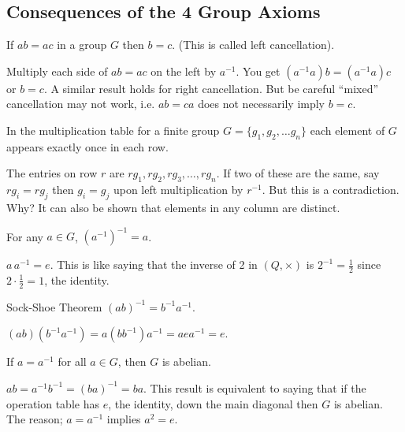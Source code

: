 \documentclass[12pt]{book}
\theoremstyle{definition}
\begin{document}
\subsection{Consequences of the 4 Group Axioms}
%
\begin{tctheorem}{}{}
If $ab=ac$ in a group $G$ then $b=c$.  (This is called left cancellation).
\end{tctheorem}
\begin{newproof}
Multiply each side of $ab=ac$ on the left by $a^{-1}$.  You get $(a^{-1}a)b=(a^{-1}a)c$ or $b=c$.  A similar result holds for right cancellation.  But be careful ``mixed'' cancellation may not work, i.e. $ab=ca$ does not necessarily imply $b=c$.
\end{newproof}

\begin{tctheorem}{}{}
In the multiplication table for a finite group $G=\{g_1,g_2,\dots g_n\}$ each element of $G$ appears exactly once in each row.
\end{tctheorem}
\begin{newproof}
The entries on row $r$ are $rg_1, rg_2,rg_3,\dots, rg_n.$  If two of these are the same, say $rg_i=rg_j$ then $g_i=g_j$ upon left multiplication by $r^{-1}$.  But this is  a contradiction.  Why?  It can also be shown that elements in any column are distinct.
\end{newproof}

%
\begin{tctheorem}{}{}
	For any $a\in G$, $(a^{-1})^{-1}=a$.
\end{tctheorem}
\begin{newproof}
$a\,a^{-1} = e$.  This is like saying that the inverse of 2 in $(Q,\times)$ is $2^{-1} =\frac12$ since $2\cdot\frac12=1$, the identity.
\end{newproof}
%
\begin{tctheorem}{Sock-Shoe Theorem}{}
$(ab)^{-1}=b^{-1}a^{-1}$. 
\end{tctheorem}
\begin{newproof}
$(ab)(b^{-1}a^{-1})=a(bb^{-1})a^{-1}=aea^{-1}=e$.
\end{newproof}
%
\begin{tctheorem}{}{}
	 If $a=a^{-1}$ for all $a\in G$, then $G$ is abelian.
\end{tctheorem}
\begin{newproof}
 $ab=a^{-1}b^{-1}=(ba)^{-1}=ba$.  This result is equivalent to saying that if the operation table has $e$, the identity, down the main diagonal then $G$ is abelian.  The reason; $a=a^{-1}$ implies $a^2=e$.
\end{newproof}
\end{document}
